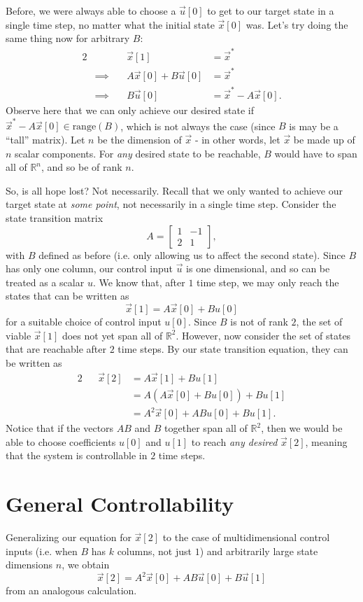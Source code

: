 \documentclass[letterpaper]{article}
\theoremstyle{remark}
\newcommand{\mat}[1]{\ensuremath{\begin{bmatrix}#1\end{bmatrix}}}
\newcommand{\eqn}[1]{\begin{alignat*}{2}#1\end{alignat*}}
\newcommand*{\thus}{&\implies\quad&}
\begin{document}
Before, we were always able to choose a $\vec{u}[0]$ to get to our target state in a single time step, no matter what the initial state $\vec{x}[0]$ was. Let's try doing the same thing now for arbitrary $B$:
\eqn{
    && \vec{x}[1] &= \vec{x}^* \\
    \thus A\vec{x}[0] + B\vec{u}[0] &= \vec{x}^* \\
    \thus B\vec{u}[0] &= \vec{x}^* - A\vec{x}[0].
}
Observe here that we can only achieve our desired state if $\vec{x}^* - A\vec{x}[0] \in \text{range}(B)$, which is not always the case (since $B$ is may be a ``tall'' matrix). Let $n$ be the dimension of $\vec{x}$ - in other words, let $\vec{x}$ be made up of $n$ scalar components. For \emph{any} desired state to be reachable, $B$ would have to span all of $\mathbb{R}^n$, and so be of rank $n$.

So, is all hope lost? Not necessarily. Recall that we only wanted to achieve our target state at \emph{some point}, not necessarily in a single time step. Consider the state transition matrix
\[
    A = \mat{1 & -1 \\ 2 & 1},
\]
with $B$ defined as before (i.e. only allowing us to affect the second state). Since $B$ has only one column, our control input $\vec{u}$ is one dimensional, and so can be treated as a scalar $u$. We know that, after $1$ time step, we may only reach the states that can be written as
\[
    \vec{x}[1] = A\vec{x}[0] + Bu[0]
\]
for a suitable choice of control input $u[0]$. Since $B$ is not of rank $2$, the set of viable $\vec{x}[1]$ does not yet span all of $\mathbb{R}^2$. However, now consider the set of states that are reachable after $2$ time steps. By our state transition equation, they can be written as
\eqn{
    && \vec{x}[2] &= A\vec{x}[1] + Bu[1] \\
    &&&= A(A\vec{x}[0] + Bu[0]) + Bu[1] \\
    &&&= A^2\vec{x}[0] + ABu[0] + Bu[1].
}
Notice that if the vectors $AB$ and $B$ together span all of $\mathbb{R}^2$, then we would be able to choose coefficients $u[0]$ and $u[1]$ to reach \emph{any desired} $\vec{x}[2]$, meaning that the system is controllable in $2$ time steps.

\section{General Controllability}
Generalizing our equation for $\vec{x}[2]$ to the case of multidimensional control inputs (i.e. when $B$ has $k$ columns, not just $1$) and arbitrarily large state dimensions $n$, we obtain
\[
    \vec{x}[2] = A^2\vec{x}[0] + AB\vec{u}[0] + B\vec{u}[1]
\]
from an analogous calculation.
\end{document}
